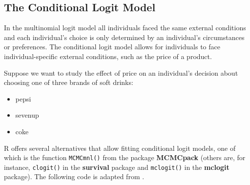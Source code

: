 \documentclass[]{book}
\providecommand{\tightlist}{%
  \setlength{\itemsep}{0pt}\setlength{\parskip}{0pt}}
\begin{document}
\hypertarget{the-conditional-logit-model}{%
\subsection{The Conditional Logit
Model}\label{the-conditional-logit-model}}

In the multinomial logit model all individuals faced the same external
conditions and each individual's choice is only determined by an
individual's circumstances or preferences. The conditional logit model
allows for individuals to face individual-specific external conditions,
such as the price of a product.

Suppose we want to study the effect of price on an individual's decision
about choosing one of three brands of soft drinks:

\begin{itemize}
\tightlist
\item
  pepsi
\item
  sevenup
\item
  coke
\end{itemize}

R offers several alternatives that allow fitting conditional logit
models, one of which is the function \texttt{MCMCmnl()} from the package
\textbf{MCMCpack} (others are, for instance, \texttt{clogit()} in the
\textbf{survival} package and \texttt{mclogit()} in the \textbf{mclogit}
package). The following code is adapted from \citet{Adkins2014}.
\end{document}
